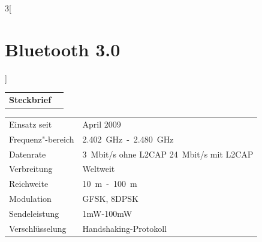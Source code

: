 \begin{multicols}{3}[\section{Bluetooth 3.0}]


\newrefsegment

\begin{tabular}{p{}p{2.7 cm}}
\textbf{Steckbrief}& \\
\end{tabular}
\begin{tabular}{p{}p{2.7 cm}}
      Einsatz seit & April 2009\\
      Frequenz"-bereich  & \SI{2,402}{\giga\hertz}~-~\SI{2,480}{\giga\hertz}\\
      Datenrate & \SI{3}{Mbit/s} ohne L2CAP \SI{24}{Mbit/s} mit L2CAP\\
      Verbreitung & Weltweit\\
      Reichweite & \SI{10}{\metre}~-~\SI{100}{\metre}\\
      Modulation & GFSK, 8DPSK\\
      Sendeleistung & 1mW-100mW\\
      Verschlüsselung & Handshaking-Protokoll\\
\end{tabular}
\par

\end{multicols}
